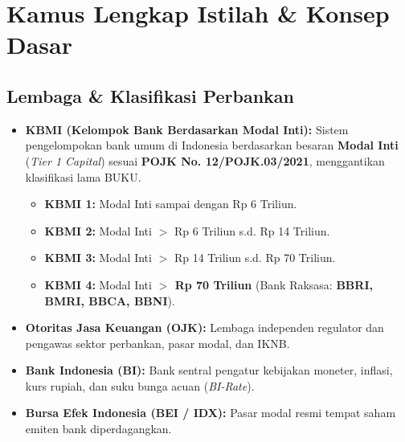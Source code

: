 \documentclass[11pt,a4paper]{article}
\begin{document}
\section{Kamus Lengkap Istilah \& Konsep Dasar}

\subsection{Lembaga \& Klasifikasi Perbankan}
\begin{itemize}
    \item \textbf{KBMI (Kelompok Bank Berdasarkan Modal Inti):} Sistem pengelompokan bank umum di Indonesia berdasarkan besaran \textbf{Modal Inti} (\textit{Tier 1 Capital}) sesuai \textbf{POJK No. 12/POJK.03/2021}, menggantikan klasifikasi lama BUKU.
    \begin{itemize}
        \item \textbf{KBMI 1:} Modal Inti sampai dengan Rp 6 Triliun.
        \item \textbf{KBMI 2:} Modal Inti $>$ Rp 6 Triliun s.d. Rp 14 Triliun.
        \item \textbf{KBMI 3:} Modal Inti $>$ Rp 14 Triliun s.d. Rp 70 Triliun.
        \item \textbf{KBMI 4:} Modal Inti \textbf{$>$ Rp 70 Triliun} (Bank Raksasa: \textbf{BBRI, BMRI, BBCA, BBNI}).
    \end{itemize}
    \item \textbf{Otoritas Jasa Keuangan (OJK):} Lembaga independen regulator dan pengawas sektor perbankan, pasar modal, dan IKNB.
    \item \textbf{Bank Indonesia (BI):} Bank sentral pengatur kebijakan moneter, inflasi, kurs rupiah, dan suku bunga acuan (\textit{BI-Rate}).
    \item \textbf{Bursa Efek Indonesia (BEI / IDX):} Pasar modal resmi tempat saham emiten bank diperdagangkan.
\end{itemize}
\end{document}
